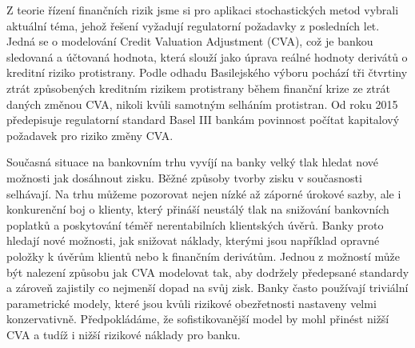 \documentclass[a4paper,12pt]{report}
\theoremstyle{definition} \newtheorem{definice}[veta]{Definice}
\theoremstyle{remark}
\begin{document}

Z teorie řízení finančních rizik jsme si pro aplikaci stochastických metod vybrali aktuální téma, jehož řešení vyžadují regulatorní požadavky z posledních let.
Jedná se o modelování Credit Valuation Adjustment (CVA), což je bankou sledovaná a účtovaná hodnota, která slouží jako úprava reálné hodnoty derivátů o kreditní riziko protistrany.
Podle odhadu Basilejského výboru pochází tři čtvrtiny ztrát způsobených kreditním rizikem protistrany během finanční krize ze ztrát daných změnou CVA, nikoli kvůli samotným selháním protistran. 
Od roku 2015 předepisuje regulatorní standard Basel III bankám povinnost počítat kapitalový požadavek pro riziko změny CVA.

Současná situace na bankovním trhu vyvíjí na banky velký tlak hledat nové možnosti jak dosáhnout zisku.
Běžné způsoby tvorby zisku v současnosti selhávají.
Na trhu můžeme pozorovat nejen nízké až záporné úrokové sazby, ale i konkurenční boj o klienty, který přináší neustálý tlak na snižování bankovních poplatků a poskytování téměř nerentabilních klientských úvěrů.
Banky proto hledají nové možnosti, jak snižovat náklady, kterými jsou například opravné položky k úvěrům klientů nebo k finančním derivátům.
Jednou z možností může být nalezení způsobu jak CVA modelovat tak, aby dodržely předepsané standardy a zároveň zajistily co nejmenší dopad na svůj zisk. 
Banky často používají triviální parametrické modely, které jsou kvůli rizikové obezřetnosti nastaveny velmi konzervativně.
Předpokládáme, že sofistikovanější model by mohl přinést nižší CVA a tudíž i nižší rizikové náklady pro banku. 
\end{document}
